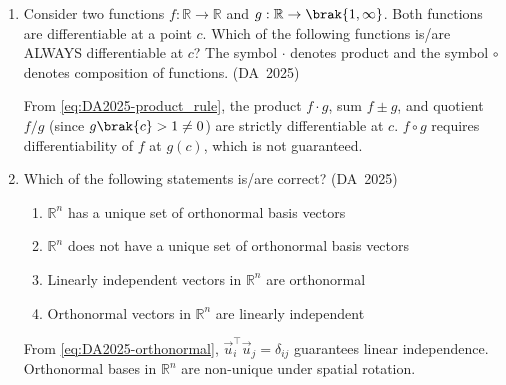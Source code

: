 \begin{enumerate}[label=\thesubsection.\arabic*, ref=\thesubsection.\theenumi]
\begin{lstlisting}[frame=single, basicstyle=\rmfamily, xleftmargin=0pt, escapeinside={(*@}{@*)}]
\end{lstlisting}
	\item 
	Consider two functions $f: \mathbb{R} \to \mathbb{R}$ and $g: \mathbb{R} \to \brak{1, \infty}$. Both functions are differentiable at a point $c$. Which of the following functions is/are ALWAYS differentiable at $c$? The symbol $\cdot$ denotes product and the symbol $\circ$ denotes composition of functions.
	\hfill (DA~2025)
	\begin{enumerate}
	\end{enumerate}
	\solution
	From \eqref{eq:DA2025-product_rule}, the product $f \cdot g$, sum $f \pm g$, and quotient $f/g$ (since $g\brak{c} > 1 \ne 0$) are strictly differentiable at $c$. $f \circ g$ requires differentiability of $f$ at $g(c)$, which is not guaranteed.
	
	\item 
	Which of the following statements is/are correct?
	\hfill (DA~2025)
	\begin{enumerate}
		\item $\mathbb{R}^n$ has a unique set of orthonormal basis vectors
		\item $\mathbb{R}^n$ does not have a unique set of orthonormal basis vectors
		\item Linearly independent vectors in $\mathbb{R}^n$ are orthonormal
		\item Orthonormal vectors in $\mathbb{R}^n$ are linearly independent
	\end{enumerate}
	\solution
	From \eqref{eq:DA2025-orthonormal}, $\vec{u}_i^\top \vec{u}_j = \delta_{ij}$ guarantees linear independence. Orthonormal bases in $\mathbb{R}^n$ are non-unique under spatial rotation.
	

\end{enumerate}
